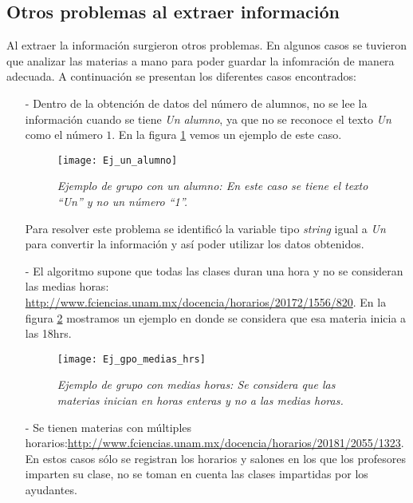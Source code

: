\subsection{Otros problemas al extraer información}

Al extraer la información surgieron otros problemas. En algunos casos se tuvieron que analizar las materias a mano para poder guardar la infomración de manera adecuada. A continuación se presentan los diferentes casos encontrados:

\begin{itemize}
\item[-] Dentro de la obtención de datos del número de alumnos, no se lee la información cuando se tiene \textit{Un alumno}, ya que no se reconoce el texto \textit{Un} como el número $1$. En la figura \ref{UnAlumno} vemos un ejemplo de este caso.

\begin{figure}[H]
\centering
\texttt{[image: Ej\_un\_alumno]} %
\caption[\textit{Ejemplo de grupo con un alumno}]{\textit{Ejemplo de grupo con un alumno: En este caso se tiene el texto ``Un'' y no un número ``1''.}}\label{UnAlumno}
\end{figure}

Para resolver este problema se identificó la variable tipo \textit{string} igual a \textit{Un} para convertir la información y así poder utilizar los datos obtenidos.
  
\item[-] El algoritmo supone que todas las clases duran una hora y no se consideran las medias horas: \url{http://www.fciencias.unam.mx/docencia/horarios/20172/1556/820}. En la figura \ref{MediasHoras} mostramos un ejemplo en donde se considera que esa materia inicia a las 18hrs.

\begin{figure}[H]
\centering
\texttt{[image: Ej\_gpo\_medias\_hrs]} %
\caption[\textit{Ejemplo de grupo con medias horas}]{\textit{Ejemplo de grupo con medias horas: Se considera que las materias inician en horas enteras y no a las medias horas.}}\label{MediasHoras}
\end{figure}

\item[-] Se tienen materias con múltiples horarios:\url{http://www.fciencias.unam.mx/docencia/horarios/20181/2055/1323}. En estos casos sólo se registran los horarios y salones en los que los profesores imparten su clase, no se toman en cuenta las clases impartidas por los ayudantes.
  

\end{itemize}
